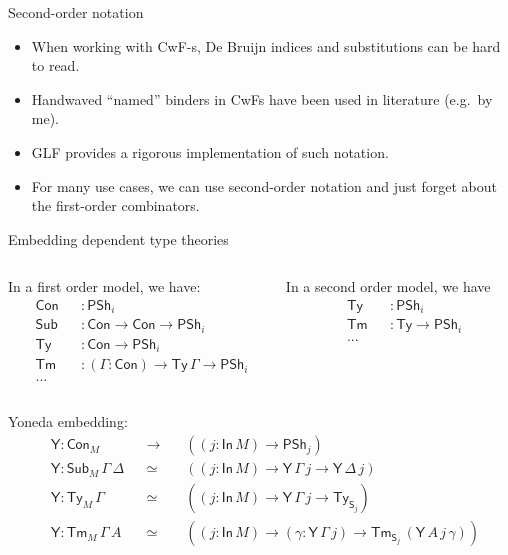 \documentclass[dvipsnames,aspectratio=169]{beamer}
\newcommand{\Con}{\mathsf{Con}}
\newcommand{\Sub}{\mathsf{Sub}}
\newcommand{\Tm}{\mathsf{Tm}}
\newcommand{\Ty}{\mathsf{Ty}}
\newcommand{\Y}{\mathsf{Y}}
\newcommand{\In}{\mathsf{In}}
\newcommand{\PSh}{\mathsf{PSh}}
\renewcommand{\S}{\mathsf{S}}
\begin{document}
\begin{frame}{Second-order notation}
  \begin{itemize}
  \item When working with CwF-s, De Bruijn indices and substitutions
        can be hard to read.
  \item Handwaved ``named'' binders in CwFs have been used in literature (e.g.\ by me).
  \item GLF provides a rigorous implementation of such notation.
  \item For many use cases, we can use second-order notation and just forget about
        the first-order combinators.
  \end{itemize}
\end{frame}

\begin{frame}{Embedding dependent type theories}

\begin{columns}
\begin{column}{0.5\textwidth}
In a first order model, we have:
\begin{alignat*}{3}
  &\Con &&: \PSh_i \\
  &\Sub &&: \Con \to \Con \to \PSh_i \\
  &\Ty  &&: \Con \to \PSh_i \\
  &\Tm  &&: (\Gamma : \Con) \to \Ty\,\Gamma \to \PSh_i \\
  & ... &&
\end{alignat*}
\end{column}
\begin{column}{0.5\textwidth}
In a second order model, we have
\begin{alignat*}{3}
  &\Ty  &&: \PSh_i \\
  &\Tm  &&: \Ty \to \PSh_i \\
  & ... && \\
  & && \\
  & &&
\end{alignat*}
\end{column}
\end{columns}
\vspace{0.5em}
\pause
Yoneda embedding:
\begin{alignat*}{4}
  & \Y : \Con_M &&\to\,&&((j : \In\,M) \to \PSh_j) \\
  & \Y : \Sub_M\,\Gamma\,\Delta &&\simeq &&((j : \In\,M) \to \Y\,\Gamma\,j \to \Y\,\Delta\,j) \\
  & \Y : \Ty_M\,\Gamma &&\simeq &&((j : \In\,M) \to \Y\,\Gamma\,j \to \Ty_{\S_j})\\
  & \Y : \Tm_M\,\Gamma\,A &&\simeq &&((j : \In\,M) \to (\gamma : \Y\,\Gamma\,j) \to \Tm_{\S_j}\,(\Y\,A\,j\,\gamma))
\end{alignat*}

\end{frame}
\end{document}
